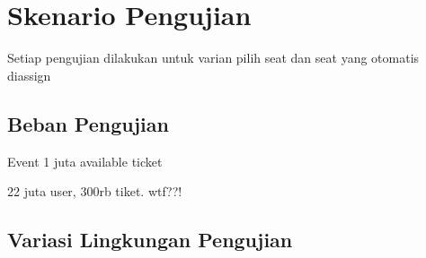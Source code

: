\section{Skenario Pengujian}

Setiap pengujian dilakukan untuk varian pilih seat dan seat yang otomatis diassign


\subsection{Beban Pengujian}

Event 1 juta available ticket


22 juta user, 300rb tiket. wtf??!



\subsection{Variasi Lingkungan Pengujian}